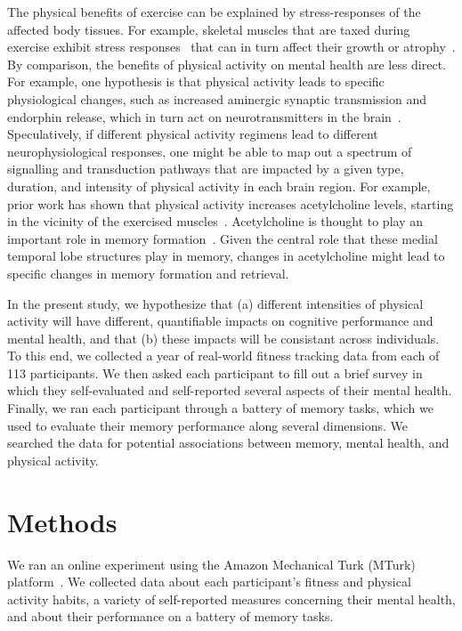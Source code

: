 \documentclass[10pt]{article}
\begin{document}
The physical benefits of exercise can be explained by stress-responses
of the affected body tissues. For example, skeletal muscles that are
taxed during exercise exhibit stress responses~\citep{MortEtal09} that
can in turn affect their growth or atrophy~\citep{SchiEtal13}.  By
comparison, the benefits of physical activity on mental health are less direct.
For example, one hypothesis is that physical activity leads to specific
physiological changes, such as increased aminergic synaptic
transmission and endorphin release, which in turn act on
neurotransmitters in the brain~\citep{PaluSchw00}.  Speculatively, if
different physical activity regimens lead to different neurophysiological
responses, one might be able to map out a spectrum of signalling and
transduction pathways that are impacted by a given type, duration, and
intensity of physical activity in each brain region.  For example, prior work
has shown that physical activity increases acetylcholine levels, starting in
the vicinity of the exercised muscles~\citep{ShoeEtal97}.
Acetylcholine is thought to play an important role in memory
formation~\citep[e.g., by modulating specific synaptic inputs from
entorhinal cortex to the hippocampus, albeit in
rodents;][]{PalaEtal21}.  Given the central role that these medial
temporal lobe structures play in memory, changes in acetylcholine
might lead to specific changes in memory formation and retrieval.

In the present study, we hypothesize that (a) different intensities of physical activity will have different, quantifiable impacts on cognitive
performance and mental health, and that (b) these impacts will be
consistant across individuals.  To this end, we collected a year of
real-world fitness tracking data from each of 113 participants.  We
then asked each participant to fill out a brief survey in which they
self-evaluated and self-reported several aspects of their mental
health.  Finally, we ran each participant through a battery of memory
tasks, which we used to evaluate their memory performance along
several dimensions.  We searched the data for potential associations
between memory, mental health, and physical activity.

 \section*{Methods}

    We ran an online experiment using the Amazon Mechanical Turk (MTurk)
    platform~\citep{GureEtal16}.  We collected data about each participant's fitness and
    physical activity habits, a variety of self-reported measures concerning their
    mental health, and about their performance on a battery of memory
    tasks.
\end{document}
